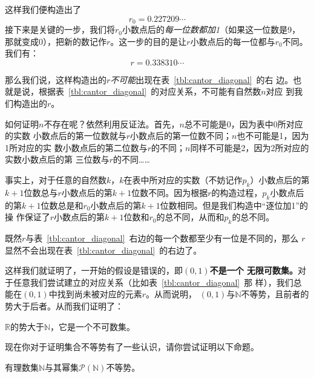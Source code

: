 这样我们便构造出了
\[
    r_{0}=0.227209\cdots 
\]
接下来是关键的一步，我们将$r_{0}$小数点后的\emph{每一位数都加1}（如果这一位数是9，
那就变成0），把新的数记作$r$。这一步的目的是让$r$小数点后的每一位都与$r_{0}$不同。
我们有：
\[
    r=0.338310\cdots 
\]

那么我们说，这样构造出的$r$\emph{不可能}出现在表~\ref{tbl:cantor_diagonal}~的右
边。也就是说，根据表~\ref{tbl:cantor_diagonal}~的对应关系，不可能有自然数$n$对应
到我们构造出的$r$。

如何证明$n$不存在呢？依然利用反证法。首先，$n$总不可能是0，因为表中0所对应的实数
小数点后的第一位数就与$r$小数点后的第一位数不同；$n$也不可能是1，因为1所对应的实
数小数点后的第二位数与$r$的不同；$n$同样不可能是2，因为2所对应的实数小数点后的第
三位数与$r$的不同……

事实上，对于任意的自然数$k$，$k$在表中所对应的实数（不妨记作$p_k$）小数点后的第
$k+1$位数总与$r$小数点后的第$k+1$位数不同。因为根据$r$的构造过程，$p_k$小数点后
的第$k+1$位数总是和$r_{0}$小数点后的第$k+1$位数相同。但是我们构造中“逐位加1”的操
作保证了$r$小数点后的第$k+1$位数和$r_{0}$的总不同，从而和$p_k$的总不同。

既然$r$与表~\ref{tbl:cantor_diagonal}~右边的每一个数都至少有一位是不同的，那么
$r$显然不会出现在表~\ref{tbl:cantor_diagonal}~的右边了。

这样我们就证明了，一开始的假设是错误的，即\textbf{$\left( 0,1 \right) $不是一个
无限可数集。}对于任意我们尝试建立的对应关系（比如表~\ref{tbl:cantor_diagonal}~那
样），我们总能在$\left( 0,1 \right) $中找到尚未被对应的元素$r$。从而说明，
$\left( 0,1 \right) $与$\mathbb{N}$不等势，且前者的势大于后者。从而我们证明了：

\begin{rawthm}
    $\mathbb{R}$的势大于$\mathbb{N}$，它是一个不可数集。
\end{rawthm}

现在你对于证明集合不等势有了一些认识，请你尝试证明以下命题。

\begin{rawprp}[2024台州二模19题改]
    有理数集$\mathbb{N}$与其幂集$\mathcal{P}(\mathbb{N})$不等势。    
\end{rawprp}


